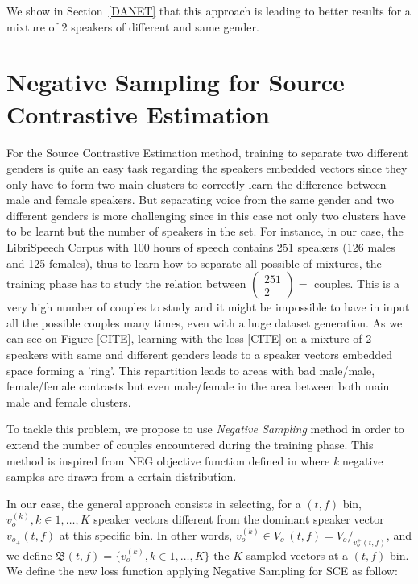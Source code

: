 \documentclass[master, tikz, final,11pt, dvipdfmx]{iscs-thesis}
\begin{document}
We show in Section~\ref{DANET} that this approach is leading to better results for a mixture of 2 speakers of different and same gender.


\section{Negative Sampling for Source Contrastive Estimation}

For the Source Contrastive Estimation method, training to separate two different genders is quite an easy task regarding the speakers embedded vectors since they only have to form two main clusters to correctly learn the difference between male and female speakers. But separating voice from the same gender and two different genders is more challenging since in this case not only two clusters have to be learnt but the number of speakers in the set. For instance, in our case, the LibriSpeech Corpus with 100 hours of speech contains 251 speakers (126 males and 125 females), thus to learn how to separate all possible of mixtures, the training phase has to study the relation between $\left(\! \begin{array}{c} 251 \\ 2 \end{array} \!\right) = $ couples. This is a very high number of couples to study and it might be impossible to have in input all the possible couples many times, even with a huge dataset generation. As we can see on Figure [CITE], learning with the loss [CITE] on a mixture of 2 speakers with same and different genders leads to a speaker vectors embedded space forming a 'ring'. This repartition leads to areas with bad male/male, female/female contrasts but even male/female in the area between both main male and female clusters. 

To tackle this problem, we propose to use \textit{Negative Sampling} method in order to extend the number of couples encountered during the training phase. This method is inspired from NEG objective function  defined in \cite{NS} where \textit{k} negative samples are drawn from a certain distribution. 

In our case, the general approach consists in selecting, for a $(t,f)$ bin, $v_o^{(k)}, k \in 1,\dotsc,K$ speaker vectors different from the dominant speaker vector $v_{o_{+}}(t,f)$ at this specific bin. In other words, $v_o^{(k)} \in V_o^-(t,f) = V_o/_{v_o^+(t,f)}$, and we define $\mathfrak{B}(t,f) = \{v_o^{(k)}, k \in 1,\dotsc,K\}$ the $K$ sampled vectors at a $(t,f)$ bin. We define the new loss function applying Negative Sampling for SCE as follow:
\end{document}
